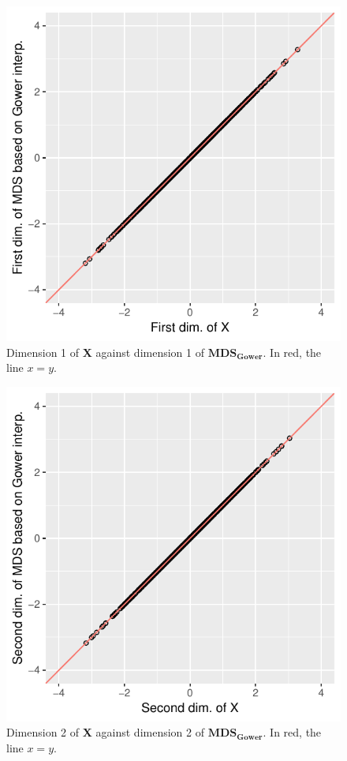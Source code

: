 \documentclass[11pt]{report}
\begin{document}
\begin{figure}[h]
    \centering
    \includegraphics[scale = 1]{./images/first_gower.pdf} 
    \caption{Dimension 1 of \textbf{X} against dimension 1 of  $\mathbf{MDS_{Gower}}$. In red, the line $x=y$.}
    \label{gower_example1}
\end{figure}

\FloatBarrier

\begin{figure}[h]
    \centering
    \includegraphics[scale = 1]{./images/second_gower.pdf}
    \caption{Dimension 2 of \textbf{X} against dimension 2 of  $\mathbf{MDS_{Gower}}$. In red, the line $x=y$.}
    \label{gower_example2}
\end{figure}
\FloatBarrier
\end{document}
